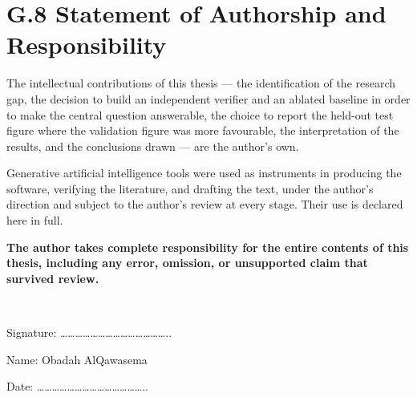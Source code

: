 \hypertarget{g.8-statement-of-authorship-and-responsibility}{%
\section{G.8 Statement of Authorship and Responsibility}\label{g.8-statement-of-authorship-and-responsibility}}

The intellectual contributions of this thesis --- the identification of the research gap, the decision to build an independent verifier and an ablated baseline in order to make the central question answerable, the choice to report the held-out test figure where the validation figure was more favourable, the interpretation of the results, and the conclusions drawn --- are the author's own.

Generative artificial intelligence tools were used as instruments in producing the software, verifying the literature, and drafting the text, under the author's direction and subject to the author's review at every stage. Their use is declared here in full.

\textbf{The author takes complete responsibility for the entire contents of this thesis, including any error, omission, or unsupported claim that survived review.}

~

Signature: \ldots\ldots\ldots\ldots\ldots\ldots\ldots\ldots\ldots\ldots\ldots\ldots\ldots\ldots..

Name: Obadah AlQawasema

Date: \ldots\ldots\ldots\ldots\ldots\ldots\ldots\ldots\ldots\ldots\ldots\ldots\ldots\ldots..
